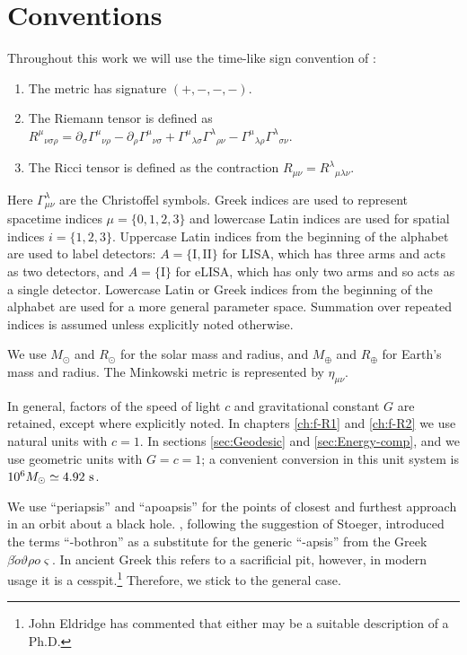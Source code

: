 \chapter{Conventions}
\label{conventions}

Throughout this work we will use the time-like sign convention of \citet{Landau1975}:
\begin{enumerate}
\item The metric has signature $(+,-,-,-)$.
\item The Riemann tensor is defined as ${R^\mu}_{\nu\sigma\rho} = \partial_\sigma {\Gamma^\mu}_{\nu\rho} - \partial_\rho {\Gamma^\mu}_{\nu\sigma} + {\Gamma^\mu}_{\lambda\sigma}{\Gamma^\lambda}_{\rho\nu} - {\Gamma^\mu}_{\lambda\rho}{\Gamma^\lambda}_{\sigma\nu}$.
\item The Ricci tensor is defined as the contraction $R_{\mu\nu} = {R^\lambda}_{\mu\lambda\nu}$.
\end{enumerate}
Here $\Gamma^\lambda_{\mu\nu}$ are the Christoffel symbols. Greek indices are used to represent spacetime indices $\mu = \{0,1,2,3\}$ %
and lowercase Latin indices are used for spatial indices $i = \{1,2,3\}$. Uppercase Latin indices from the beginning of the alphabet are used to label detectors: $A = \{\mathrm{I}, \mathrm{II}\}$ for LISA, which has three arms and acts as two detectors, and $A = \{\mathrm{I}\}$ for eLISA, which has only two arms and so acts as a single detector. Lowercase Latin or Greek indices from the beginning of the alphabet are used for a more general parameter space. Summation over repeated indices is assumed unless explicitly noted otherwise.

We use $M_\odot$ and $R_\odot$ for the solar mass and radius, and $M_\oplus$ and $R_\oplus$ for Earth's mass and radius. The Minkowski metric is represented by $\eta_{\mu\nu}$.

In general, factors of the speed of light $c$ and gravitational constant $G$ are retained, except where explicitly noted. In chapters \ref{ch:f-R1} and \ref{ch:f-R2} we use natural units with $c = 1$. In sections \ref{sec:Geodesic} and \ref{sec:Energy-comp},  and  we use geometric units with $G = c = 1$; a convenient conversion in this unit system is $10^6 M_\odot \simeq 4.92~\mathrm{s}$.

We use ``periapsis'' and ``apoapsis'' for the points of closest and furthest approach in an orbit about a black hole. \citet{Frank1976}, following the suggestion of Stoeger, introduced the terms ``-bothron'' as a substitute for the generic ``-apsis'' from the Greek {$\mathit{\beta\acute{o}\vartheta\rho o \varsigma}$}. In ancient Greek this refers to a sacrificial pit, however, in modern usage it is a cesspit.\footnote{John Eldridge has commented that either may be a suitable description of a Ph.D.} Therefore, we stick to the general case.